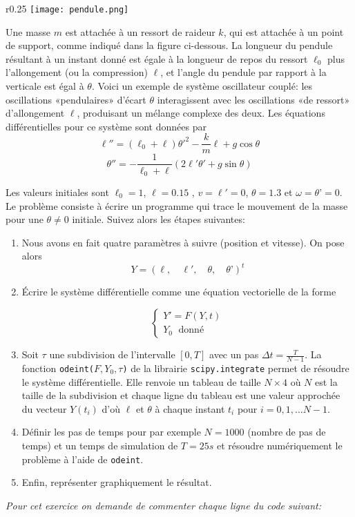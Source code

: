 \documentclass[a4paper]{article}
\begin{document}
 \begin{wrapfigure}{r}{0.25\textwidth} %
    \centering
 \texttt{[image: pendule.png]}
\end{wrapfigure}
 Une masse $m$ est attachée à un ressort de raideur $k$, qui est attachée à un point de support, comme indiqué dans la figure ci-dessous. La longueur du pendule résultant à un instant donné est égale à la longueur de repos du ressort $\ell_0$ plus l'allongement (ou la compression) $\ell$, et l'angle du pendule par rapport à la verticale est égal à $\theta$. Voici un exemple de système oscillateur couplé: les oscillations «pendulaires» d'écart $\theta$ interagissent avec les oscillations «de ressort» d'allongement $\ell$, produisant un mélange complexe des deux. Les équations différentielles pour ce système sont données par
 \[ \ell''=(\ell_0+\ell)\theta'^2-\frac{k}{m}\ell+g\cos\theta \]
  \[ \theta''=-\frac 1{\ell_0+\ell}\left(2\ell' \theta'+g\sin\theta\right) \]

  Les valeurs initiales sont $\ell_0=1$, $\ell=0.15$ , $v=\ell'=0$, $\theta=1.3$  et  $\omega=\theta’=0$. Le problème consiste à écrire un programme qui trace le mouvement de la masse pour une $\theta \neq 0$  initiale. Suivez alors les étapes suivantes:

\begin{enumerate}
\item Nous avons en fait quatre paramètres à suivre (position et vitesse). On pose  alors \[Y=(\ell ,\quad \ell',\quad \theta,\quad  \theta’)^t\]

\item Écrire le système différentielle comme une équation vectorielle de la forme

\[ \left\{\begin{array}{l}
Y'=F(Y,t)\\
Y_0 \; \mbox{ donné}
\end{array}	\right.
\]
\item Soit $\tau$ une subdivision de l'intervalle $[0,T]$ avec un pas $\Delta t=\frac{T}{N-1}$. La fonction {\tt odeint($F,Y_0,\tau$)} de la librairie {\tt scipy.integrate} permet de résoudre le système différentielle. Elle renvoie un tableau de taille $N\times 4$ où $N$ est la taille de la subdivision et chaque ligne du tableau est une valeur approchée du vecteur $Y(t_i)$ d'où $\ell$ et $\theta$ à chaque instant $t_i$ pour $i=0,1,... N-1$.

\item Définir les pas de temps pour par exemple $N = 1000$ (nombre de pas de temps) et un temps de simulation de $T = 25 s$ et résoudre numériquement le problème à l'aide de {\tt odeint}.

\item Enfin, représenter graphiquement le résultat.
\end{enumerate}
{\em Pour cet exercice on demande de commenter chaque ligne du code suivant:}
\end{document}
